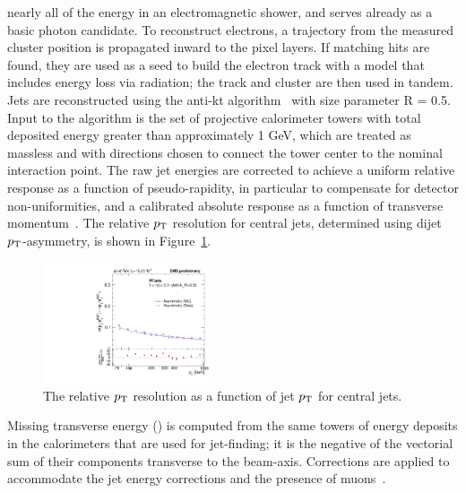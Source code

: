 nearly all of the energy in an electromagnetic shower, and serves already as a basic
photon candidate. To reconstruct electrons, a trajectory from the measured cluster
position is propagated inward to the pixel layers. If matching hits are found, they are
used as a seed to build the electron track with a model that includes energy loss via
radiation; the track and cluster are then used in tandem.\\
\indent Jets are reconstructed using the anti-kt algorithm~\cite{antikt} with size parameter R = 0.5.
Input to the algorithm is the set of projective calorimeter towers with total deposited
energy greater than approximately 1 GeV, which are treated as massless and with
directions chosen to connect the tower center to the nominal interaction point. The
raw jet energies are corrected to achieve a uniform relative response as a function
of pseudo-rapidity, in particular to compensate for detector non-uniformities, and a
calibrated absolute response as a function of transverse momentum~\cite{Chatrchyan:2011ds}.
The relative $p_{\mathrm{T}}$ resolution for central jets, determined using dijet $p_{\mathrm{T}}$-asymmetry, is shown in
Figure~\ref{fig:jetRes}. 

\begin{figure}[h!]
  \begin{center}
      \includegraphics[width=0.45\textwidth,]{figures/ak5pf_relRes}
      \caption{\label{fig:jetRes} The relative $p_{\mathrm{T}}$ resolution as a function of jet $p_{\mathrm{T}}$
              for central jets.}
  \end{center}
\end{figure}

Missing transverse energy (\met) is computed from the same towers of energy deposits 
in the calorimeters that are used for jet-finding; it is the negative of the vectorial
sum of their components transverse to the beam-axis. Corrections are applied to
accommodate the jet energy corrections and the presence of muons~\cite{1748-0221-6-09-P09001}.

